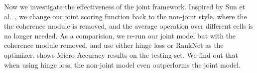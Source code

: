 Now we investigate the effectiveness of the joint framework.
Inspired by Sun et al.~,
we change our joint scoring function back to the non-joint style,
where the the coherence module is removed,
and the average operation over different cells is no longer needed.
%
%
As a comparision, we re-run our joint model but with the coherence module removed,
and use either hinge loss or RankNet as the optimizer.
 shows Micro Accuracy results on the testing set.
We find out that when using hinge loss, 
the non-joint model even outperforms the joint model.
